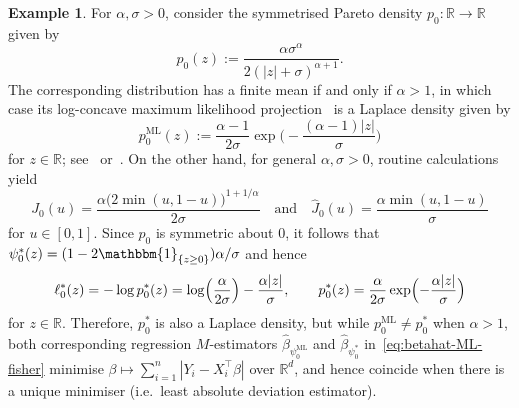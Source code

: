 \documentclass[a4paper]{article}
\newcommand{\R}{\mathbb{R}}
\newcommand{\Ind}{\mathbbm{1}}
\DeclareMathOperator{\sgn}{sgn}
\theoremstyle{definition}
\newtheorem{example}[theorem]{Example}
\begin{document}
\begin{example}
\label{ex:pareto}
For $\alpha,\sigma > 0$, consider the symmetrised Pareto density $p_0 \colon \R \to \R$ given by
\[
p_0(z) := \frac{\alpha\sigma^\alpha}{2(|z| + \sigma)^{\alpha + 1}}.
\]
The corresponding distribution has a finite mean if and only if $\alpha > 1$, in which case its log-concave maximum likelihood projection~\citep{dumbgen2011approximation} is a Laplace density given by
\begin{equation}
\label{eq:pareto-sym}
p_0^{\mathrm{ML}}(z) := \frac{\alpha - 1}{2\sigma}\exp\biggl(-\frac{(\alpha - 1)
|z|}{\sigma}\biggr)
\end{equation}
for $z \in \R$; see~\citet[p.~1382]{chen2013smoothed} or~\citet[Exercise~9.14]{samworth24modern}. On the other hand, for general $\alpha,\sigma > 0$,
routine calculations yield
\[
J_0(u) = \frac{\alpha \bigl(2\min(u, 1 - u)\bigr)^{1 + 1/\alpha}}{2\sigma} \quad\text{and}\quad \hat{J}_0(u) = \frac{\alpha\min(u, 1 - u)}{\sigma}
\]
for $u \in [0,1]$. Since $p_0$ is symmetric about 0, it follows that $\psi_0^*(z) = (1 - 2\Ind_{\{z \geq 0\}})\alpha/\sigma$ and hence
\[
\ell_0^*(z) = -\log p_0^*(z) = \log\Bigl(\frac{\alpha}{2\sigma}\Bigr) - \frac{\alpha|z|}{\sigma}, \qquad p_0^*(z) = \frac{\alpha}{2\sigma}\exp\Bigl(-\frac{\alpha
|z|}{\sigma}\Bigr)
\]
for $z \in \R$. Therefore, $p_0^*$ is also a Laplace density, but while $p_0^{\mathrm{ML}} \neq p_0^*$ when $\alpha > 1$, both corresponding regression $M$-estimators $\hat{\beta}_{\psi_0^{\mathrm{ML}}}$ and $\hat{\beta}_{\psi_0^*}$ in~\eqref{eq:betahat-ML-fisher} minimise $\beta \mapsto \sum_{i=1}^n |Y_i - X_i^\top\beta|$ over $\R^d$, and hence coincide when there is a unique minimiser (i.e.~least absolute deviation estimator).
\end{example}

\end{document}
